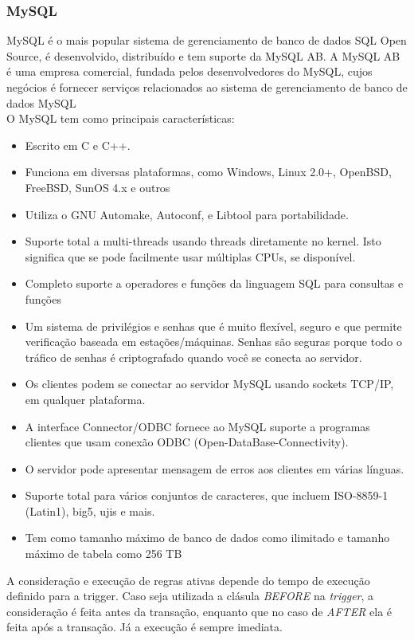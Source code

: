 \documentclass[conference]{IEEEtran}
\begin{document}
    \subsubsection{MySQL}
	  MySQL é o mais popular sistema de gerenciamento de banco de dados SQL Open Source, é desenvolvido, distribuído e tem suporte da MySQL AB. A MySQL AB é uma empresa comercial, fundada pelos desenvolvedores do MySQL, cujos negócios é fornecer serviços relacionados ao sistema de gerenciamento de banco de dados MySQL\cite{mysql-site}\\

	  
    O MySQL tem como principais características:
    \begin{itemize}
    \item Escrito em C e C++.
    \item Funciona em diversas plataformas, como Windows, Linux 2.0+, OpenBSD, FreeBSD, SunOS 4.x e outros
    \item Utiliza o GNU Automake, Autoconf, e Libtool para portabilidade.
    \item Suporte total a multi-threads usando threads diretamente no kernel. Isto significa que se pode facilmente usar múltiplas CPUs, se disponível.
    \item Completo suporte a operadores e funções da linguagem SQL para consultas e funções
    \item Um sistema de privilégios e senhas que é muito flexível, seguro e que permite verificação baseada em estações/máquinas. Senhas são seguras porque todo o tráfico de senhas é criptografado quando você se conecta ao servidor.
    \item Os clientes podem se conectar ao servidor MySQL usando sockets TCP/IP, em qualquer plataforma.
    \item A interface Connector/ODBC fornece ao MySQL suporte a programas clientes que usam conexão ODBC (Open-DataBase-Connectivity). 
    \item O servidor pode apresentar mensagem de erros aos clientes em várias línguas. 
    \item Suporte total para vários conjuntos de caracteres, que incluem ISO-8859-1 (Latin1), big5, ujis e mais.
    \item Tem como tamanho máximo de banco de dados como ilimitado e tamanho máximo de tabela como 256 TB
    \end{itemize}
    A consideração e execução de regras ativas depende do tempo de execução definido para a trigger. Caso seja utilizada a clásula \textit{BEFORE} na \textit{trigger}, a consideração é feita antes da transação, enquanto que no caso de \textit{AFTER} ela é feita após a transação. Já a execução é sempre imediata.\cite{caracteristica-myssql}
\end{document}
